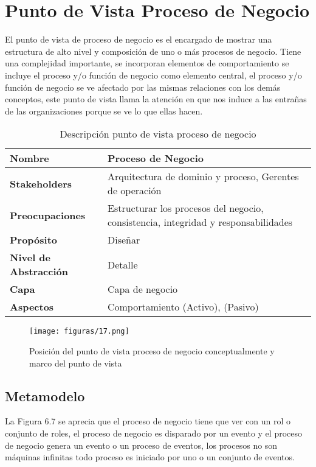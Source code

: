  \section{Punto de Vista Proceso de Negocio}
  El punto de vista de proceso de negocio es el encargado de mostrar una estructura de alto nivel y composición de uno o más procesos de negocio. Tiene una complejidad importante, se incorporan elementos de comportamiento se incluye el proceso y/o función de negocio como elemento central, el proceso y/o función de negocio se ve afectado por las mismas relaciones con los demás conceptos, este punto de vista llama la atención en que nos induce a las entrañas de las organizaciones porque se ve lo que ellas hacen.
  
  \begin{table}[!h]
  	\centering
  	\begin{tabular}{lp{8cm}}
  		\toprule
  		\textbf{Nombre} & \textbf{Proceso de Negocio} \\
  		\midrule
  		\textbf{Stakeholders} & Arquitectura de dominio y proceso, Gerentes de operación \\
  		\textbf{Preocupaciones} & Estructurar los procesos del negocio, consistencia, integridad y responsabilidades \\
  		\textbf{Propósito} & Diseñar \\
  		\textbf{Nivel de Abstracción} & Detalle \\
  		\textbf{Capa} & Capa de negocio \\
  		\textbf{Aspectos} & Comportamiento (Activo), (Pasivo) \\
  		\bottomrule
  	\end{tabular}
  	\captionsetup{width=.95\textwidth}
  	\caption{Descripción punto de vista proceso de negocio}
  	\label{Tab:tabla7}
  \end{table}
  
  \begin{figure}[!h]
  	\centering
  	\texttt{[image: figuras/17.png]}
  	\captionsetup{width=.95\textwidth}
  	\caption{Posición del punto de vista proceso de negocio conceptualmente y marco del punto de vista}
  	\label{figura17}
  \end{figure}
  
  \subsection{Metamodelo}
  La Figura 6.7 se aprecia que el proceso de negocio tiene que ver con un rol o conjunto de roles, el proceso de negocio es disparado por un evento y el proceso de negocio genera un evento o un proceso de eventos, los procesos no son máquinas infinitas todo proceso es
  iniciado por uno o un conjunto de eventos.
  

